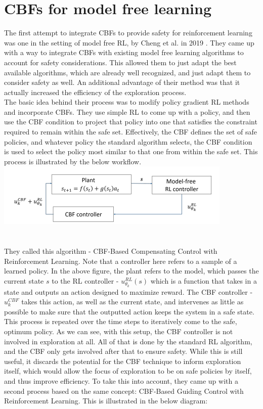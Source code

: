 \documentclass{article}
\begin{document}
\section{CBFs for model free learning}
The first attempt to integrate CBFs to provide safety for reinforcement learning was one in the setting of model free RL, by Cheng et al. in 2019 \cite{cheng2019end}. They came up with a way to integrate CBFs with existing model free learning algorithms to account for safety considerations. This allowed them to just adapt the best available algorithms, which are already well recognized, and just adapt them to consider safety as well. An additional advantage of their method was that it actually increased the efficiency of the exploration process. \\
The basic idea behind their process was to modify policy gradient RL methods and incorporate CBFs. They use simple RL to come up with a policy, and then use the CBF condition to project that policy into one that satisfies the constraint required to remain within the safe set. Effectively, the CBF defines the set of safe policies, and whatever policy the standard algorithm selects, the CBF condition is used to select the policy most similar to that one from within the safe set. This process is illustrated by the below workflow.\\
\includegraphics[scale = 1.5]{Screenshot 2023-05-13 180156.png}\\\\\\
They called this algorithm - CBF-Based Compensating Control with Reinforcement Learning. Note that a controller here refers to a sample of a learned policy. In the above figure, the plant refers to the model, which passes the current state $s$ to the RL controller - $u_{\theta_k}^{RL}(s)$ which is a function that takes in a state and outputs an action designed to maximize reward. The CBF controller - $u_k^{CBF}$ takes this action, as well as the current state, and intervenes as little as possible to make sure that the outputted action keeps the system in a safe state. This process is repeated over the time steps to iteratively come to the safe, optimum policy. As we can see, with this setup, the CBF controller is not involved in exploration at all. All of that is done by the standard RL algorithm, and the CBF only gets involved after that to ensure safety. While this is still useful, it discards the potential for the CBF technique to inform exploration itself, which would allow the focus of exploration to be on safe policies by itself, and thus improve efficiency. To take this into account, they came up with a second process based on the same concept: CBF-Based Guiding Control with Reinforcement Learning. This is illustrated in the below diagram: \\
\end{document}
